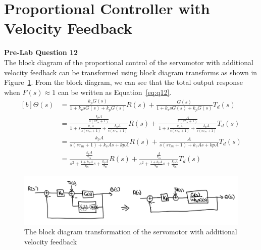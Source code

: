 \documentclass[12pt]{article}
\begin{document}
\section{Proportional Controller with Velocity Feedback}
\textbf{Pre-Lab Question 12} \\
The block diagram of the proportional control of the servomotor with additional velocity feedback can be transformed using block diagram transforms as shown in Figure~\ref{fig:q12}. From the block diagram, we can see that the total output response when $F(s) \approx 1$ can be written as Equation~\ref{eq:q12}.
\begin{equation} \label{eq:q12}
\begin{aligned}[b]
    \Theta(s) &= \frac{k_pG(s)}{1 + k_vsG(s) + k_pG(s)}R(s) + \frac{G(s)}{1 + k_vsG(s) + k_pG(s)}T_d(s) \\
    &= \frac{\frac{k_pA}{s(s\tau_m + 1)}}{1 + s\frac{k_vA}{s(s\tau_m + 1)} + \frac{k_pA}{s(s\tau_m + 1)}}R(s) + \frac{\frac{A}{s(s\tau_m + 1)}}{1 + s\frac{k_vA}{s(s\tau_m + 1)} + \frac{k_pA}{s(s\tau_m + 1)}}T_d(s) \\
    &= \frac{k_pA}{s(s\tau_m + 1) + k_vAs + kpA}R(s) + \frac{A}{s(s\tau_m + 1) + k_vAs + kpA}T_d(s) \\
    &= \frac{\frac{k_pA}{\tau_m}}{s^2 + \frac{1+k_vA}{\tau_m}s + \frac{k_pA}{\tau_m}}R(s) + \frac{\frac{A}{\tau_m}}{s^2 + \frac{1+k_vA}{\tau_m}s + \frac{k_pA}{\tau_m}}T_d(s)
\end{aligned}
\end{equation}
\begin{figure}[h!]
    \centering
    \includegraphics[width=\textwidth]{q12}
    \caption{\label{fig:q12}The block diagram transformation of the servomotor with additional velocity feedback}
\end{figure}
\end{document}
